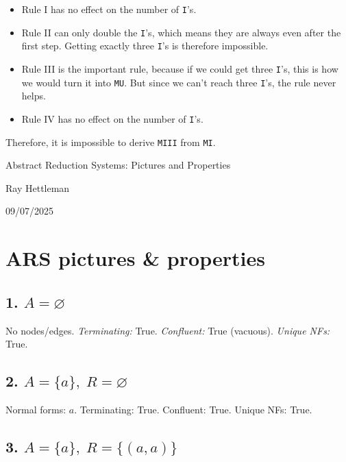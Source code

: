 \documentclass[11pt]{article}
\newcommand{\ARSnode}[1]{%
  \node[circle,draw,minimum size=7mm,inner sep=0pt] (#1) {$#1$};%
}
\begin{document}
\begin{itemize}
    \item Rule I has no effect on the number of \texttt{I}'s.  
    \item Rule II can only double the \texttt{I}'s, which means they are always even after the first step. Getting exactly three \texttt{I}'s is therefore impossible.  
    \item Rule III is the important rule, because if we could get three \texttt{I}'s, this is how we would turn it into \texttt{MU}. But since we can’t reach three \texttt{I}'s, the rule never helps.  
    \item Rule IV has no effect on the number of \texttt{I}'s.  
\end{itemize}

Therefore, it is impossible to derive \texttt{MIII} from \texttt{MI}.

\newpage
\begin{center}
{\LARGE Abstract Reduction Systems: Pictures and Properties\par}
\vspace{0.5em}
{\large Ray Hettleman\par}
\vspace{0.5em}
{\normalsize 09/07/2025\par}
\end{center}

\section*{ARS pictures \& properties}

\subsection*{1.\; $A=\varnothing$}
No nodes/edges. \emph{Terminating:} True. \emph{Confluent:} True (vacuous). \emph{Unique NFs:} True.

\subsection*{2.\; $A=\{a\},\; R=\varnothing$}

Normal forms: $a$. Terminating: True. Confluent: True. Unique NFs: True.

\subsection*{3.\; $A=\{a\},\; R=\{(a,a)\}$}
\end{document}
